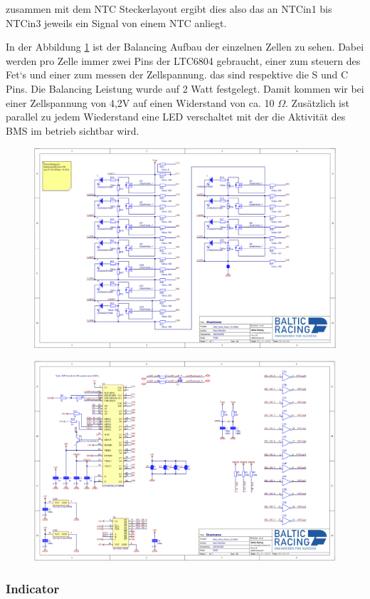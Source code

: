 zusammen mit dem NTC Steckerlayout ergibt dies also das an NTCin1 bis NTCin3 jeweils ein Signal von einem NTC anliegt.

In der Abbildung \ref{fig:amsbalancingschematic} ist der Balancing Aufbau der einzelnen Zellen zu sehen. Dabei werden pro Zelle immer zwei Pins der LTC6804 gebraucht, einer zum steuern des Fet`s und einer zum messen der Zellspannung. das sind respektive die S und C Pins. Die Balancing Leistung wurde auf 2 Watt festgelegt. Damit kommen wir bei einer Zellspannung von 4,2V auf einen Widerstand von ca. 10 $\Omega$. Zusätzlich ist parallel zu jedem Wiederstand eine LED verschaltet mit der die Aktivität des BMS im betrieb sichtbar wird.

\begin{figure}
	\centering
	\includegraphics[width=0.7\linewidth]{bilder/AMS_Balancing_Schematic}
	\caption{}
	\label{fig:amsbalancingschematic}
\end{figure}


\begin{figure}
	\centering
	\includegraphics[width=0.7\linewidth]{bilder/AMS_slave_controller_schematic}
	\caption{}
	\label{fig:amsslavecontrollerschematic}
\end{figure}

\FloatBarrier
\subsubsection{ Indicator}

